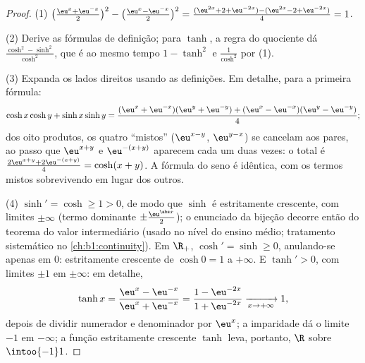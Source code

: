 \begin{proof}
(1) $\bigl(\frac{\eu^x + \eu^{-x}}{2}\bigr)^2 - \bigl(\frac{\eu^x -
\eu^{-x}}{2}\bigr)^2 = \frac{(\eu^{2x} + 2 + \eu^{-2x}) - (\eu^{2x} -
2 + \eu^{-2x})}{4} = 1$.

(2) Derive as fórmulas de definição; para $\tanh$, a regra do
quociente dá $\frac{\cosh^2 - \sinh^2}{\cosh^2}$, que é ao mesmo tempo
$1 - \tanh^2$ e $\frac{1}{\cosh^2}$ por (1).

(3) Expanda os lados direitos usando as definições. Em detalhe,
para a primeira fórmula:
\[
\cosh x\cosh y + \sinh x\sinh y
= \frac{(\eu^x + \eu^{-x})(\eu^y + \eu^{-y})
+ (\eu^x - \eu^{-x})(\eu^y - \eu^{-y})}{4} ;
\]
dos oito produtos, os quatro ``mistos''
($\eu^{x-y}$, $\eu^{y-x}$) se cancelam aos pares, ao passo que
$\eu^{x+y}$ e $\eu^{-(x+y)}$ aparecem cada um duas vezes:
o total é $\frac{2\eu^{x+y} + 2\eu^{-(x+y)}}{4} = \cosh(x+y)$.
A fórmula do seno é idêntica, com os termos mistos sobrevivendo
em lugar dos outros.

(4) $\sinh' = \cosh \geq 1 > 0$, de modo que $\sinh$ é estritamente crescente,
com limites $\pm\infty$ (termo dominante $\pm\frac{\eu^{\abs
x}}{2}$);
o enunciado da bijeção decorre então do teorema do valor intermediário
(usado no nível do ensino médio; tratamento sistemático no
\cref{ch:b1:continuity}). Em $\R_+$, $\cosh' = \sinh \geq 0$,
anulando-se apenas em $0$: estritamente crescente de $\cosh 0 = 1$ a
$+\infty$. E $\tanh' > 0$, com limites $\pm 1$ em $\pm\infty$: em
detalhe,
\[
\tanh x = \frac{\eu^x - \eu^{-x}}{\eu^x + \eu^{-x}}
= \frac{1 - \eu^{-2x}}{1 + \eu^{-2x}}
\xrightarrow[x \to +\infty]{} 1 ,
\]
depois de dividir numerador e denominador por $\eu^x$; a imparidade
dá o limite $-1$ em $-\infty$; a função estritamente crescente
$\tanh$ leva, portanto, $\R$ sobre $\intoo{-1}1$.
\end{proof}

